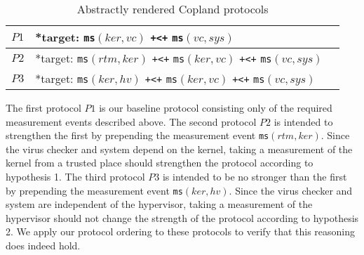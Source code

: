 \documentclass[runningheads]{llncs}
\theoremstyle{definition}
\begin{document}

\begin{table}[h]
  \setlength\extrarowheight{7pt}
  \centering
  \footnotesize
  \begin{tabular}{|M{1cm}|M{8cm}|N}
      \hline  
      $P1$ & *target:  \texttt{ms}$(ker, vc)$ \texttt{+<+} \texttt{ms}$(vc, sys)$ &\\ \hline 
      $P2$ & *target: \texttt{ms}$(rtm, ker)$ \texttt{+<+} \texttt{ms}$(ker, vc)$ \texttt{+<+} \texttt{ms}$(vc, sys)$ &\\
      \hline
      $P3$ & *target: \texttt{ms}$(ker, hv)$ \texttt{+<+} \texttt{ms}$(ker, vc)$ \texttt{+<+} \texttt{ms}$(vc, sys)$ &\\ \hline 
  \end{tabular}
  \caption[Chase Analysis with Varied Dependencies]{Abstractly rendered Copland protocols}
  \label{Chase-table}
\end{table}


The first protocol $P1$ is our baseline protocol consisting only of the required measurement events described above. The second protocol $P2$ is intended to strengthen the first by prepending the measurement event \texttt{ms}$(rtm,ker)$. Since the virus checker and system depend on the kernel, taking a measurement of the kernel from a trusted place should strengthen the protocol according to hypothesis 1. The third protocol $P3$ is intended to be no stronger than the first by prepending the measurement event \texttt{ms}$(ker,hv)$. Since the virus checker and system are independent of the hypervisor, taking a measurement of the hypervisor should not change the strength of the protocol according to hypothesis 2. We apply our protocol ordering to these protocols to verify that this reasoning does indeed hold.
\end{document}
